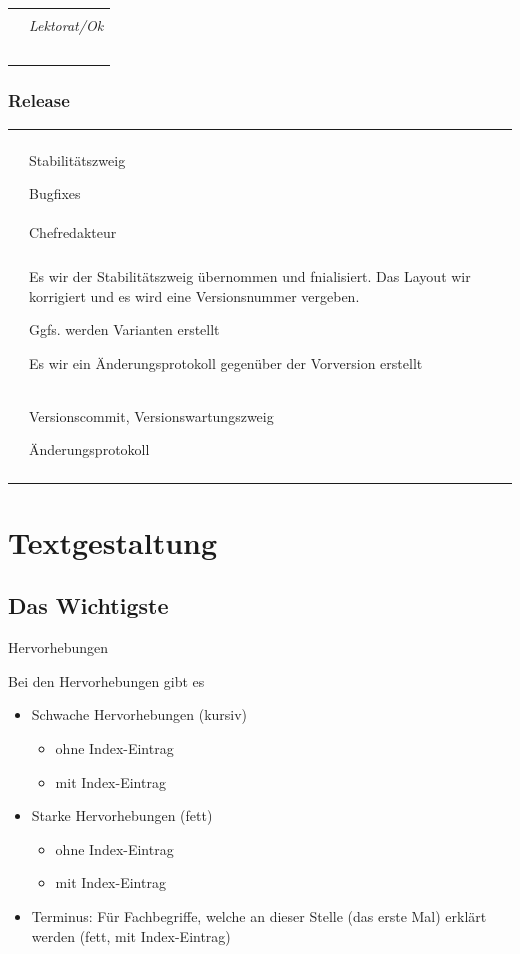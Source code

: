 \documentclass[
ngerman,
paper=a4,
asymmetric,
fontsize=10pt,
draft=false,
numbers=noenddot,
bibtotocnumbered,
footnotes=multiple,
toc=flat,
]{scrbook}
\newcommand{\Branch}[1]{\emph{#1}}
\newcommand{\Entwicklunsgprozessschritt}[8]
{
\noindent\begin{tabularx}{\linewidth}{lX}
\addlinespace\toprule\addlinespace
\multicolumn{2}{c}{Prozessschritt:
\TabHeading{\color{DefaultA}#1}}
\\\addlinespace\midrule\addlinespace \noindent\TabSub{Input} & #4
\\\addlinespace
\TabSub{Verantwortlicher} & #6
\\\addlinespace
\TabSub{Mitwirkende} & #7
\\\addlinespace
\TabSub{Tätigkeit} & #8
\\\addlinespace
\TabSub{Output} & #5
\\\addlinespace\bottomrule\addlinespace
\end{tabularx}
}
\begin{document}
\Entwicklunsgprozessschritt
{%
Aufnahme Stabilitätszweig}
{%
}
{%
}
{%
\Branch{Lektorat/Ok}}
{%
}
{%
\T{Chefredakteur}}
{%
}
{%
}

\subsection{Release}

\Entwicklunsgprozessschritt
{%
Release}
{%
}
{%
}
{%
Stabilitätszweig

Bugfixes
}
{%
Versionscommit, Versionswartungszweig

Änderungsprotokoll}
{%
Chefredakteur}
{%
}
{%
Es wir der Stabilitätszweig übernommen und fnialisiert. Das
Layout wir korrigiert und es wird eine Versionsnummer
vergeben.

Ggfs. werden Varianten erstellt

Es wir ein Änderungsprotokoll gegenüber der Vorversion
erstellt }


\chapter{Textgestaltung}

\minitoc

\section{Das Wichtigste}

\Text
{Hervorhebungen}
{Bei den Hervorhebungen gibt es 
\begin{itemize}
  \item Schwache Hervorhebungen (kursiv)
  \begin{itemize}
    \item ohne Index-Eintrag
    \item mit Index-Eintrag
  \end{itemize}
  \item Starke Hervorhebungen (fett)
  \begin{itemize}
    \item ohne Index-Eintrag
    \item mit Index-Eintrag
  \end{itemize}
  \item Terminus: Für Fachbegriffe, welche an dieser Stelle (das erste Mal) erklärt werden (fett, mit Index-Eintrag)
\end{itemize}}
{}
{}
{}
{}
\end{document}
